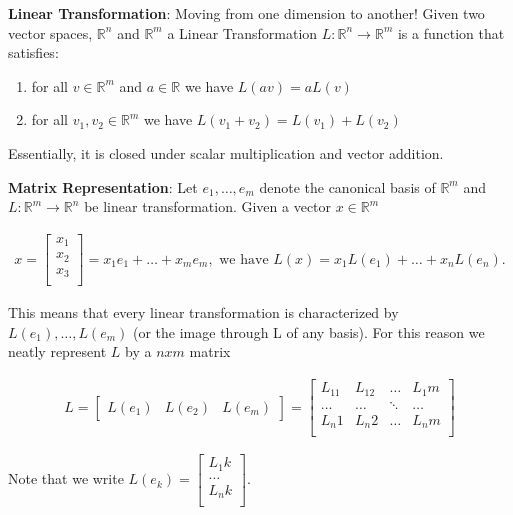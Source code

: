\documentclass[12pt]{article}
\newenvironment{definition}[2][Definition]{\begin{trivlist}
\item[\hskip \labelsep {\bfseries #1}\hskip \labelsep {\bfseries #2}]}{\end{trivlist}}
\begin{document}
\begin{definition}{1.6} \textbf{Linear Transformation}: Moving from one dimension to another! Given two vector spaces, \(\mathbb{R}^n\) and \(\mathbb{R}^m\) a Linear Transformation \(L : \mathbb{R}^n \rightarrow \mathbb{R}^m\) is a function that satisfies:
\begin{enumerate}
    \item for all \(v \in \mathbb{R}^m\) and \(a \in \mathbb{R}\) we have \(L(av) = aL(v)\)
    \item for all \(v_1, v_2 \in \mathbb{R}^m\) we have \(L(v_1+v_2) = L(v_1) + L(v_2)\)
\end{enumerate}

\noindent
Essentially, it is closed under scalar multiplication and vector addition.
\end{definition}
\begin{definition}{1.7} \textbf{Matrix Representation}: Let \(e_1, \dots, e_m\) denote the canonical basis of \(\mathbb{R}^m\) and \(L:\mathbb{R}^m \rightarrow \mathbb{R}^n\) be linear transformation. Given a vector \(x \in \mathbb{R}^m\)

\begin{equation}
\begin{split}
x =
\begin{bmatrix}
    x_1 \\
    x_2 \\
    x_3 \\
\end{bmatrix}
= 
x_1 e_1 + \dots + x_m e_m, \textrm{ we have } L(x) = x_1 L(e_1) + \dots + x_n L(e_n).
\end{split}
\end{equation}

\noindent
This means that every linear transformation is characterized by \(L(e_1),\dots,L(e_m)\) (or the image through L of any basis). For this reason we neatly represent $L$ by a $n x m$ matrix

\begin{equation}
\begin{split}
L =
\begin{bmatrix}
    L(e_1) & L(e_2) & L(e_m)
\end{bmatrix}
= 
\begin{bmatrix}
    L_11 & L_12 & \dots & L_1m \\
    \dots & \dots & \ddots & \dots \\
    L_n1 & L_n2 & \dots & L_nm \\
\end{bmatrix}
\end{split}
\end{equation}

\noindent
Note that we write \(L(e_k) = \begin{bmatrix}
    L_1k \\
    \dots \\
    L_nk \\
\end{bmatrix}.\)
\end{definition}
\end{document}
